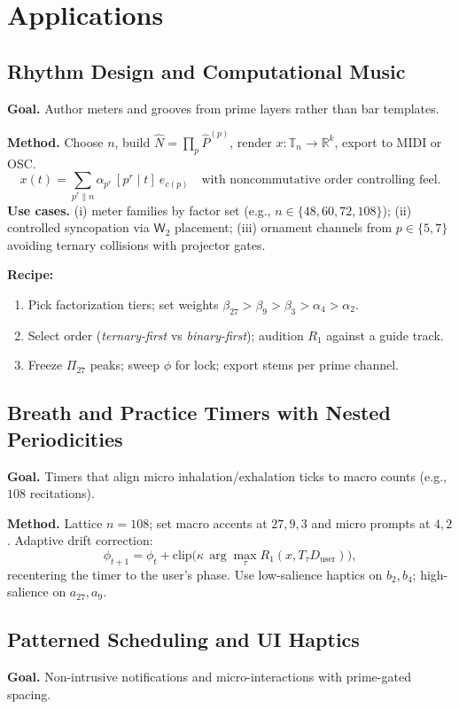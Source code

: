 \documentclass[12pt]{article}
\numberwithin{equation}{section}
\theoremstyle{plain}
\theoremstyle{definition}
\theoremstyle{remark}
\begin{document}
\section*{Applications}

\subsection*{Rhythm Design and Computational Music}
\textbf{Goal.} Author meters and grooves from prime layers rather than bar templates.

\noindent\textbf{Method.} Choose $n$, build $\widehat{N}=\prod_p \hat{P}^{(p)}$, render $x:\mathbb{T}_n\to\mathbb{R}^k$, export to MIDI or OSC.
\[
x(t)=\sum_{p^r\parallel n}\alpha_{p^r}\,[p^r\mid t]\ e_{c(p)}\quad\text{with noncommutative order controlling feel.}
\]
\textbf{Use cases.} 
(i) meter families by factor set (e.g., $n\in\{48,60,72,108\}$);
(ii) controlled syncopation via $\mathsf{W}_2$ placement;
(iii) ornament channels from $p\in\{5,7\}$ avoiding ternary collisions with projector gates.

\medskip
\noindent\textbf{Recipe:}
\begin{enumerate}
\item Pick factorization tiers; set weights $\beta_{27}>\beta_9>\beta_3>\alpha_4>\alpha_2$.
\item Select order (\emph{ternary-first} vs \emph{binary-first}); audition $R_1$ against a guide track.
\item Freeze $\Pi_{27}$ peaks; sweep $\phi$ for lock; export stems per prime channel.
\end{enumerate}

\subsection*{Breath and Practice Timers with Nested Periodicities}
\textbf{Goal.} Timers that align micro inhalation/exhalation ticks to macro counts (e.g., $108$ recitations).

\noindent\textbf{Method.} Lattice $n=108$; set macro accents at $27,9,3$ and micro prompts at $4,2$.
Adaptive drift correction:
\[
\phi_{t+1}=\phi_t+\mathrm{clip}\big(\kappa\,\arg\max_{\tau}R_1(x, T_\tau D_{\text{user}})\big),
\]
recentering the timer to the user’s phase. Use low-salience haptics on $b_2,b_4$; high-salience on $a_{27},a_9$.

\subsection*{Patterned Scheduling and UI Haptics}
\textbf{Goal.} Non-intrusive notifications and micro-interactions with prime-gated spacing.
\end{document}
